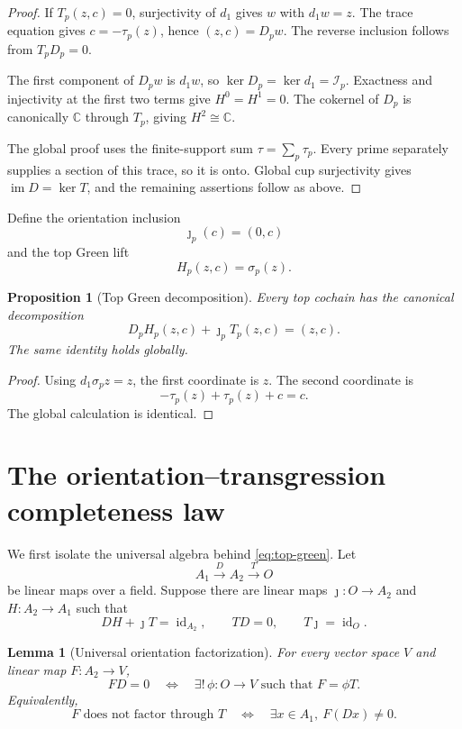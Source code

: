\documentclass[11pt]{article}
\newtheorem{proposition}[theorem]{Proposition}
\newtheorem{lemma}[theorem]{Lemma}
\theoremstyle{definition}
\theoremstyle{remark}
\newcommand{\C}{\mathbb C}
\newcommand{\cI}{\mathcal I}
\newcommand{\im}{\operatorname{im}}
\newcommand{\id}{\operatorname{id}}
\begin{document}
\begin{proof}
If \(T_p(z,c)=0\), surjectivity of \(d_1\) gives \(w\) with \(d_1w=z\).
The trace equation gives \(c=-\tau_p(z)\), hence \((z,c)=D_pw\).
The reverse inclusion follows from \(T_pD_p=0\).

The first component of \(D_pw\) is \(d_1w\), so
\(\ker D_p=\ker d_1=\cI_p\).  Exactness and injectivity at the first two
terms give \(H^0=H^1=0\).  The cokernel of \(D_p\) is canonically \(\C\)
through \(T_p\), giving \(H^2\cong\C\).

The global proof uses the finite-support sum
\(\tau=\sum_p\tau_p\).  Every prime separately supplies a section of this
trace, so it is onto.  Global cup surjectivity gives
\(\im D=\ker T\), and the remaining assertions follow as above.
\end{proof}

Define the orientation inclusion
\[
                     \jmath_p(c)=(0,c)
\tag{4.7}\label{eq:orientation-inclusion}
\]
and the top Green lift
\[
                     H_p(z,c)=\sigma_p(z).
\tag{4.8}\label{eq:top-green-lift}
\]

\begin{proposition}[Top Green decomposition]
\label{prop:top-green}
Every top cochain has the canonical decomposition
\[
                   D_pH_p(z,c)+\jmath_pT_p(z,c)=(z,c).
\tag{4.9}\label{eq:top-green}
\]
The same identity holds globally.
\end{proposition}

\begin{proof}
Using \(d_1\sigma_pz=z\), the first coordinate is \(z\).  The second
coordinate is
\[
               -\tau_p(z)+\tau_p(z)+c=c.
\]
The global calculation is identical.
\end{proof}

\section{The orientation--transgression completeness law}
\label{sec:main-law}

We first isolate the universal algebra behind
\eqref{eq:top-green}.  Let
\[
 A_1\xrightarrow{D}A_2\xrightarrow{T}O
\tag{5.1}\label{eq:abstract-complex}
\]
be linear maps over a field.  Suppose there are linear maps
\(\jmath:O\to A_2\) and \(H:A_2\to A_1\) such that
\[
                  DH+\jmath T=\id_{A_2},\qquad
                  TD=0,\qquad T\jmath=\id_O.
\tag{5.2}\label{eq:abstract-green}
\]

\begin{lemma}[Universal orientation factorization]
\label{lem:universal-factorization}
For every vector space \(V\) and linear map \(F:A_2\to V\),
\[
  FD=0
  \quad\Longleftrightarrow\quad
  \exists!\,\phi:O\to V\text{ such that }F=\phi T.
\tag{5.3}\label{eq:factorization}
\]
Equivalently,
\[
  F\text{ does not factor through }T
  \quad\Longleftrightarrow\quad
  \exists x\in A_1,\ F(Dx)\ne0.
\tag{5.4}\label{eq:boundary-detection}
\]
\end{lemma}
\end{document}
